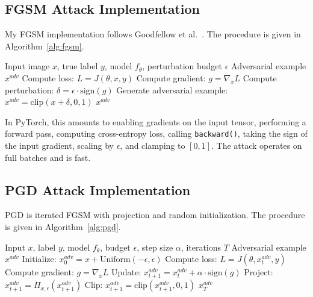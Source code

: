 \subsection{FGSM Attack Implementation}

My FGSM implementation follows Goodfellow et al.~\cite{goodfellow2015explaining}. The procedure is given in Algorithm~\ref{alg:fgsm}.

\begin{algorithm}[htbp]
\caption{Fast Gradient Sign Method (FGSM)}
\label{alg:fgsm}
\begin{algorithmic}[1]
\REQUIRE Input image $x$, true label $y$, model $f_\theta$, perturbation budget $\epsilon$
\ENSURE Adversarial example $x^{adv}$
\STATE Compute loss: $L = J(\theta, x, y)$
\STATE Compute gradient: $g = \nabla_x L$
\STATE Compute perturbation: $\delta = \epsilon \cdot \text{sign}(g)$
\STATE Generate adversarial example: $x^{adv} = \text{clip}(x + \delta, 0, 1)$
\RETURN $x^{adv}$
\end{algorithmic}
\end{algorithm}

In PyTorch, this amounts to enabling gradients on the input tensor, performing a forward pass, computing cross-entropy loss, calling \texttt{backward()}, taking the sign of the input gradient, scaling by $\epsilon$, and clamping to $[0, 1]$. The attack operates on full batches and is fast.

\subsection{PGD Attack Implementation}

PGD is iterated FGSM with projection and random initialization. The procedure is given in Algorithm~\ref{alg:pgd}.

\begin{algorithm}[htbp]
\caption{Projected Gradient Descent (PGD) Attack}
\label{alg:pgd}
\begin{algorithmic}[1]
\REQUIRE Input $x$, label $y$, model $f_\theta$, budget $\epsilon$, step size $\alpha$, iterations $T$
\ENSURE Adversarial example $x^{adv}$
\STATE Initialize: $x^{adv}_0 = x + \text{Uniform}(-\epsilon, \epsilon)$ 
    \STATE Compute loss: $L = J(\theta, x^{adv}_t, y)$
    \STATE Compute gradient: $g = \nabla_x L$
    \STATE Update: $x^{adv}_{t+1} = x^{adv}_t + \alpha \cdot \text{sign}(g)$
    \STATE Project: $x^{adv}_{t+1} = \Pi_{x,\epsilon}(x^{adv}_{t+1})$ 
    \STATE Clip: $x^{adv}_{t+1} = \text{clip}(x^{adv}_{t+1}, 0, 1)$
\ENDFOR
\RETURN $x^{adv}_T$
\end{algorithmic}
\end{algorithm}

